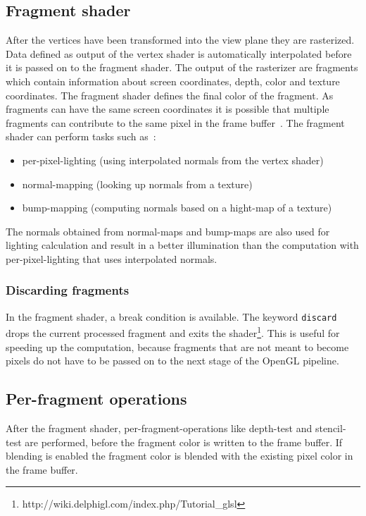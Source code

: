 \subsection{Fragment shader}	
After the vertices have been transformed into the view plane they are rasterized. Data defined as output of the vertex shader is automatically interpolated before it is passed on to the fragment shader. The output of the rasterizer are fragments which contain information about screen coordinates, depth, color and texture coordinates. The fragment shader defines the final color of the fragment. As fragments can have the same screen coordinates it is possible that multiple fragments can contribute to the same pixel in the frame buffer~\cite{book:computerGraphicsHill}. The fragment shader can perform tasks such as~\cite{book:computerGraphicsHill}: %
\begin{itemize}%
	\item per-pixel-lighting (using interpolated normals from the vertex shader)
	\item normal-mapping (looking up normals from a texture)
	\item bump-mapping (computing normals based on a hight-map of a texture)
\end{itemize}

The normals obtained from normal-maps and bump-maps are also used for lighting calculation and result in a better illumination than the computation with per-pixel-lighting that uses interpolated normals.

\subsubsection{Discarding fragments}
In the fragment shader, a break condition is available. The keyword \texttt{discard} drops the current processed fragment and exits the shader\footnote{http://wiki.delphigl.com/index.php/Tutorial{\_}glsl}. This is useful for speeding up the computation, because fragments that are not meant to become pixels do not have to be passed on to the next stage of the OpenGL pipeline.

\subsection{Per-fragment operations}
After the fragment shader, per-fragment-operations like depth-test and stencil-test are performed, before the fragment color is written to the frame buffer. If blending is enabled the fragment color is blended with the existing pixel color in the frame buffer.

